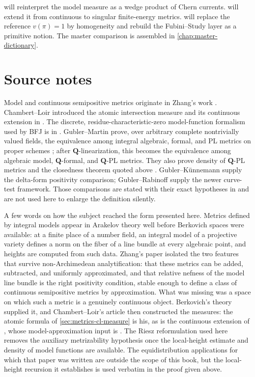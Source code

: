  will reinterpret the model measure as a wedge product of
Chern currents.  will extend it from continuous to singular
finite-energy metrics.  will replace the reference
$v(\pi)=1$ by homogeneity and rebuild the Fubini--Study layer as a
primitive notion. The master comparison is assembled in
\cref{chap:master-dictionary}.

\section*{Source notes}

Model and continuous semipositive metrics originate in Zhang's work
\cite{Zhang1995}.
Chambert--Loir introduced the atomic intersection measure and its continuous
extension in \cite{CL06}. The discrete, residue-characteristic-zero
model-function formalism used by BFJ is in \cite[Sections~2--5]{BFJ16}.
Gubler--Martin \cite{GM19} prove, over arbitrary complete nontrivially valued
fields, the equivalence among integral algebraic, formal, and PL metrics on
proper schemes \cite[Theorem~1.1]{GM19}; after $\mathbf Q$-linearization,
this becomes the equivalence among algebraic model, $\mathbf Q$-formal,
and $\mathbf Q$-PL metrics. They also prove density of $\mathbf Q$-PL
metrics \cite[Theorem~1.2 and Theorem~2.17]{GM19} and the closedness theorem
quoted above \cite[Theorem~1.3 and Theorem~5.5]{GM19}.
Gubler--Künnemann supply the delta-form positivity comparison;
Gubler--Rabinoff supply the newer curve-test framework. Those comparisons
are stated with their exact hypotheses in
 and are not used
here to enlarge the definition silently.

A few words on how the subject reached the form presented here. Metrics
defined by integral models appear in Arakelov theory well before Berkovich
spaces were available: at a finite place of a number field, an integral
model of a projective variety defines a norm on the fiber of a line bundle
at every algebraic point, and heights are computed from such data. Zhang's
paper \cite{Zhang1995} isolated the two features that survive
non-Archimedean analytification: that these metrics can be added, subtracted,
and uniformly approximated, and that relative nefness of the model line
bundle is the right positivity condition, stable enough to define a class of
continuous semipositive metrics by approximation. What was missing was a
space on which such a metric is a genuinely continuous object. Berkovich's
theory supplied it, and Chambert--Loir's article \cite{CL06} then constructed
the measures: the atomic formula of \cref{sec:metrics-cl-measure} is his, as
is the continuous extension of , whose
model-approximation input is \cite[Proposition~2.7]{CL06}. The Riesz
reformulation used here removes the auxiliary metrizability hypothesis once
the local-height estimate and density of model functions are available. The
equidistribution applications for which that paper was written are outside
the scope of this book, but the local-height recursion it establishes is
used verbatim in the proof given above.

